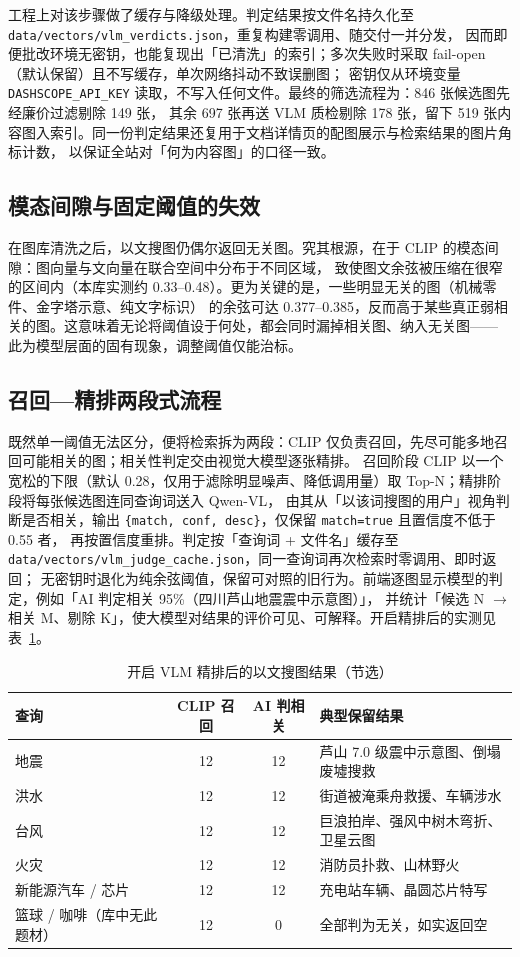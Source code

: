 \documentclass[11pt,a4paper]{ctexart}
\begin{document}
工程上对该步骤做了缓存与降级处理。判定结果按文件名持久化至 \texttt{data/vectors/vlm\_verdicts.json}，重复构建零调用、随交付一并分发，
因而即便批改环境无密钥，也能复现出「已清洗」的索引；多次失败时采取 fail-open（默认保留）且不写缓存，单次网络抖动不致误删图；
密钥仅从环境变量 \texttt{DASHSCOPE\_API\_KEY} 读取，不写入任何文件。最终的筛选流程为：846 张候选图先经廉价过滤剔除 149 张，
其余 697 张再送 VLM 质检剔除 178 张，留下 519 张内容图入索引。同一份判定结果还复用于文档详情页的配图展示与检索结果的图片角标计数，
以保证全站对「何为内容图」的口径一致。

\subsection{模态间隙与固定阈值的失效}

在图库清洗之后，以文搜图仍偶尔返回无关图。究其根源，在于 CLIP 的模态间隙：图向量与文向量在联合空间中分布于不同区域，
致使图文余弦被压缩在很窄的区间内（本库实测约 0.33--0.48）。更为关键的是，一些明显无关的图（机械零件、金字塔示意、纯文字标识）
的余弦可达 0.377--0.385，反而高于某些真正弱相关的图。这意味着无论将阈值设于何处，都会同时漏掉相关图、纳入无关图——
此为模型层面的固有现象，调整阈值仅能治标。

\subsection{召回—精排两段式流程}

既然单一阈值无法区分，便将检索拆为两段：CLIP 仅负责召回，先尽可能多地召回可能相关的图；相关性判定交由视觉大模型逐张精排。
召回阶段 CLIP 以一个宽松的下限（默认 0.28，仅用于滤除明显噪声、降低调用量）取 Top-N；精排阶段将每张候选图连同查询词送入 Qwen-VL，
由其从「以该词搜图的用户」视角判断是否相关，输出 \texttt{\{match, conf, desc\}}，仅保留 \texttt{match=true} 且置信度不低于 0.55 者，
再按置信度重排。判定按「查询词 + 文件名」缓存至 \texttt{data/vectors/vlm\_judge\_cache.json}，同一查询词再次检索时零调用、即时返回；
无密钥时退化为纯余弦阈值，保留可对照的旧行为。前端逐图显示模型的判定，例如「AI 判定相关 95\%（四川芦山地震震中示意图）」，
并统计「候选 N $\to$ 相关 M、剔除 K」，使大模型对结果的评价可见、可解释。开启精排后的实测见表~\ref{tab:judge}。

\begin{table}[ht]
\centering
\caption{开启 VLM 精排后的以文搜图结果（节选）}
\label{tab:judge}
\begin{tabular}{lccp{5.2cm}}
\toprule
查询 & CLIP 召回 & AI 判相关 & 典型保留结果 \\
\midrule
地震 & 12 & 12 & 芦山 7.0 级震中示意图、倒塌废墟搜救 \\
洪水 & 12 & 12 & 街道被淹乘舟救援、车辆涉水 \\
台风 & 12 & 12 & 巨浪拍岸、强风中树木弯折、卫星云图 \\
火灾 & 12 & 12 & 消防员扑救、山林野火 \\
新能源汽车 / 芯片 & 12 & 12 & 充电站车辆、晶圆芯片特写 \\
篮球 / 咖啡（库中无此题材） & 12 & 0 & 全部判为无关，如实返回空 \\
\bottomrule
\end{tabular}
\end{table}
\end{document}
